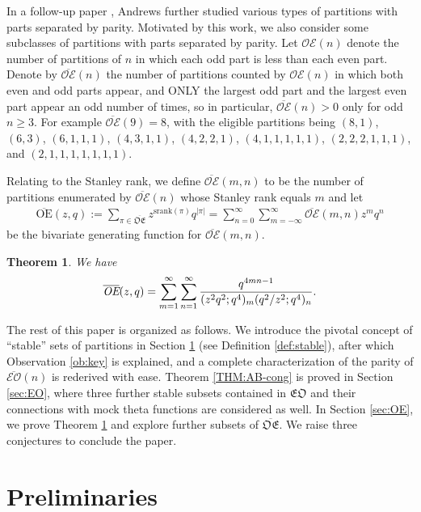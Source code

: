 \documentclass[12pt,reqno]{amsart}
\numberwithin{equation}{section}
\theoremstyle{plain}
\newtheorem{theorem}{Theorem}[section]
\theoremstyle{definition}
\def\OE{\mathcal{OE}}
\def\fEO{\mathfrak{EO}}
\def\bOE{\overline{\mathcal{OE}}}
\def\bEO{\overline{\mathcal{EO}}}
\def\bfOE{\overline{\mathfrak{OE}}}
\begin{document}
In a follow-up paper \cite{and3}, Andrews further studied various types of partitions with parts separated by
parity. Motivated by this work, we also consider some subclasses of partitions with parts separated by
parity. Let $\mathcal{OE}(n)$ denote the number of partitions of $n$ in which each odd part is less than each
even part. Denote by $\overline{\mathcal{OE}}(n)$ the number of partitions counted by $\OE(n)$ in which both
even and odd parts appear, and ONLY the largest odd part and the largest even part appear an odd number of
times, so in particular, $\overline{\mathcal{OE}}(n)>0$ only for odd $n\ge 3$. For example $\bOE(9)=8$, with
the eligible partitions being $(8,1)$, $(6,3)$, $(6,1,1,1)$, $(4,3,1,1)$, $(4,2,2,1)$, $(4,1,1,1,1,1)$,
$(2,2,2,1,1,1)$, and $(2,1,1,1,1,1,1,1)$.

Relating to the Stanley rank, we define $\bOE(m,n)$  to be the number of partitions enumerated by $\bOE(n)$
whose Stanley rank equals $m$ and let
\begin{align*}
\overline{\textrm{OE}}(z,q):=\sum_{\pi\in\overline{\mathfrak{OE}}}z^{\textrm{srank}(\pi)}q^{|\pi|}
=\sum_{n=0}^\infty\sum_{m=-\infty}^{\infty}\overline{\mathcal{OE}}(m,n)z^m q^n
\end{align*}
be the bivariate generating function for $\overline{\mathcal{OE}}(m,n)$.

\begin{theorem}\label{thm:bOE-srank-gf}
We have
\begin{align}\label{gf:boe}
\overline{\emph{OE}}(z,q)=\sum_{m=1}^{\infty}\sum_{n=1}^{\infty}
\dfrac{q^{4mn-1}}{(z^2q^2;q^4)_{m}(q^2/z^2;q^4)_{n}}.
\end{align}
\end{theorem}

The rest of this paper is organized as follows. We introduce the pivotal concept of ``stable'' sets of
partitions in Section \ref{sec:pre} (see Definition \ref{def:stable}), after which Observation \ref{ob:key} is
explained, and a complete characterization of the parity of $\bEO(n)$ is rederived with ease. Theorem
\ref{THM:AB-cong} is proved in Section \ref{sec:EO}, where three further stable subsets contained in $\fEO$ and
their connections with mock theta functions are considered as well. In Section \ref{sec:OE}, we prove
Theorem \ref{thm:bOE-srank-gf} and explore further subsets of $\bfOE$. We raise three conjectures to conclude
the paper.






\section{Preliminaries}\label{sec:pre}
\end{document}
